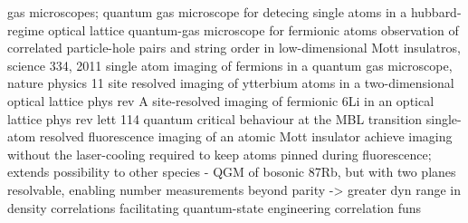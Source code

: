 gas microscopes; 
	\cite{Bakr09}  quantum gas microscope for detecing single atoms in a hubbard-regime optical lattice
	\cite{Cheuk15}  quantum-gas microscope for fermionic atoms
	\cite{Endres11} observation of correlated particle-hole pairs and string order in low-dimensional Mott insulatros, science 334, 2011
	\cite{Haller15}  single atom imaging of fermions in a quantum gas microscope, nature physics 11
	\cite{Miranda15} site resolved imaging of ytterbium atoms in a two-dimensional optical lattice phys rev A
	\cite{Parsons15} site-resolved imaging of fermionic 6Li in an optical lattice phys rev lett 114
	\cite{Rispoli19} quantum critical behaviour at the MBL transition
	\cite{Sherson10} single-atom resolved fluorescence imaging of an atomic Mott insulator
	\cite{Miranda17} achieve imaging without the laser-cooling required to keep atoms pinned during fluorescence; extends possibility to other species
	\cite{Preiss15a} - QGM of bosonic 87Rb, but with two planes resolvable, enabling number measurements beyond parity -> greater dyn range in density correlations
facilitating quantum-state engineering
	\cite{Chiu18}%
	\cite{Kozlowski17}%
	\cite{Preiss15a}%
correlation funs
	\cite{Endres11}%
	\cite{Rispoli19}%